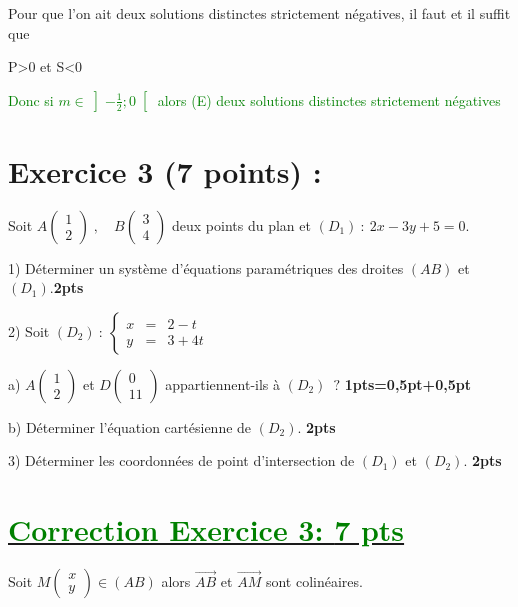 \documentclass[12pt]{article}
\begin{document}
Pour que l'on ait deux solutions distinctes strictement négatives, il faut et il suffit que

 P>0 et S<0

\textcolor{green}{Donc si $m\in\left]-\frac{1}{2} ; 0\right[ $ alors (E) deux solutions distinctes strictement négatives}

\section*{Exercice 3 (7 points) :}
Soit $A\begin{pmatrix} 1 \\ 2\end{pmatrix}\;,\quad B\begin{pmatrix} 3 \\ 4\end{pmatrix}$ deux points du plan et $(D_{1})\ :\ 2x-3y+5=0.$

1) Déterminer un système d'équations paramétriques des droites $(AB)$ et $(D_{1}).$\textbf{2pts}

2) Soit $(D_{2})\ :\ \left\lbrace\begin{array}{rcl} x&=&2-t \\ y&=&3+4t\end{array}\right.$

a) $A\begin{pmatrix} 1 \\ 2\end{pmatrix}$ et $D\begin{pmatrix} 0 \\ 11\end{pmatrix}$ appartiennent-ils à $(D_{2})\;\ ?$ \textbf{1pts=0,5pt+0,5pt}

b) Déterminer l'équation cartésienne de $(D_{2})$. \textbf{2pts}

3) Déterminer les coordonnées de point d'intersection de $(D_{1})$ et $(D_{2})$. \textbf{2pts}
\section*{\underline{\textcolor{green}{Correction Exercice 3: \textbf{7 pts}}}}
Soit $M\begin{pmatrix} x \\ y\end{pmatrix}\in(AB)$ alors $\overrightarrow{AB}$ et $\overrightarrow{AM}$ sont colinéaires.
\end{document}
